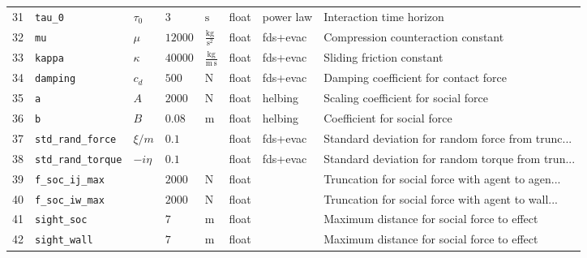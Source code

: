 \begin{tabularx}{1.0\linewidth}{llllllll}
31 &                    \verb|tau_0| &       $\tau_{0}$ &                                 $3$ &                 $\mathrm{s}$ &       float &  power law &                           Interaction time horizon \\
32 &                       \verb|mu| &            $\mu$ &                             $12000$ &  $\mathrm{\frac{kg}{s^{2}}}$ &       float &   fds+evac &                 Compression counteraction constant \\
33 &                    \verb|kappa| &         $\kappa$ &                             $40000$ &   $\mathrm{\frac{kg}{m\,s}}$ &       float &   fds+evac &                          Sliding friction constant \\
34 &                  \verb|damping| &          $c_{d}$ &                               $500$ &                 $\mathrm{N}$ &       float &   fds+evac &              Damping coefficient for contact force \\
35 &                        \verb|a| &              $A$ &                              $2000$ &                 $\mathrm{N}$ &       float &    helbing &               Scaling coefficient for social force \\
36 &                        \verb|b| &              $B$ &                              $0.08$ &                 $\mathrm{m}$ &       float &    helbing &                       Coefficient for social force \\
37 &           \verb|std_rand_force| &        $\xi / m$ &                               $0.1$ &                              &       float &   fds+evac &  Standard deviation for random force from trunc... \\
38 &          \verb|std_rand_torque| &       $- i \eta$ &                               $0.1$ &                              &       float &   fds+evac &  Standard deviation for random torque from trun... \\
39 &             \verb|f_soc_ij_max| &                  &                              $2000$ &                 $\mathrm{N}$ &       float &            &  Truncation for social force with agent to agen... \\
40 &             \verb|f_soc_iw_max| &                  &                              $2000$ &                 $\mathrm{N}$ &       float &            &  Truncation for social force with agent to wall... \\
41 &                \verb|sight_soc| &                  &                                 $7$ &                 $\mathrm{m}$ &       float &            &        Maximum distance for social force to effect \\
42 &               \verb|sight_wall| &                  &                                 $7$ &                 $\mathrm{m}$ &       float &            &        Maximum distance for social force to effect \\
\end{tabularx}
